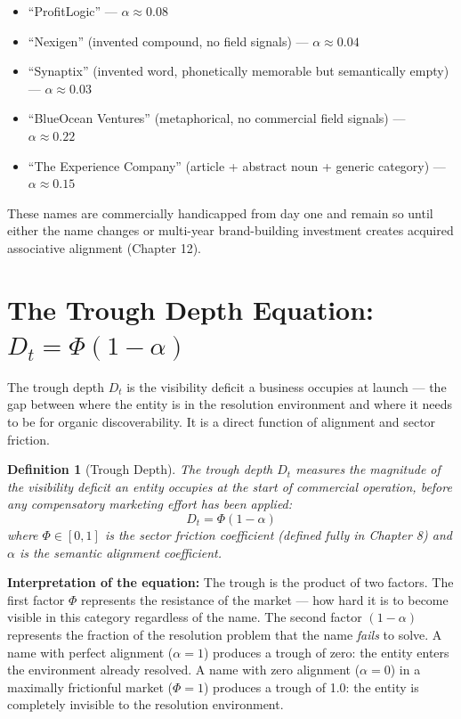 \documentclass[12pt, openany]{book}
\theoremstyle{thmstyle}
\theoremstyle{defstyle}
\newtheorem{definition}{Definition}[chapter]
\newcommand{\Dt}{D_t}
\begin{document}
\begin{examplebox}
\begin{itemize}[leftmargin=1.5em]
  \item ``ProfitLogic'' --- $\alpha \approx 0.08$
  \item ``Nexigen'' (invented compound, no field signals) --- $\alpha \approx 0.04$
  \item ``Synaptix'' (invented word, phonetically memorable but semantically empty) --- $\alpha \approx 0.03$
  \item ``BlueOcean Ventures'' (metaphorical, no commercial field signals) --- $\alpha \approx 0.22$
  \item ``The Experience Company'' (article + abstract noun + generic category) --- $\alpha \approx 0.15$
\end{itemize}
These names are commercially handicapped from day one and remain so until either the name changes or multi-year brand-building investment creates acquired associative alignment (Chapter 12).
\end{examplebox}

\section{The Trough Depth Equation: $D_t = \Phi(1 - \alpha)$}

The trough depth $\Dt$ is the visibility deficit a business occupies at launch --- the gap between where the entity is in the resolution environment and where it needs to be for organic discoverability. It is a direct function of alignment and sector friction.

\begin{definition}[Trough Depth]
The trough depth $\Dt$ measures the magnitude of the visibility deficit an entity occupies at the start of commercial operation, before any compensatory marketing effort has been applied:
\begin{equation}
D_t = \Phi(1 - \alpha)
\label{eq:trough}
\end{equation}
where $\Phi \in [0, 1]$ is the sector friction coefficient (defined fully in Chapter 8) and $\alpha$ is the semantic alignment coefficient.
\end{definition}

\textbf{Interpretation of the equation:} The trough is the product of two factors. The first factor $\Phi$ represents the resistance of the market --- how hard it is to become visible in this category regardless of the name. The second factor $(1 - \alpha)$ represents the fraction of the resolution problem that the name \textit{fails} to solve. A name with perfect alignment ($\alpha = 1$) produces a trough of zero: the entity enters the environment already resolved. A name with zero alignment ($\alpha = 0$) in a maximally frictionful market ($\Phi = 1$) produces a trough of 1.0: the entity is completely invisible to the resolution environment.
\end{document}
